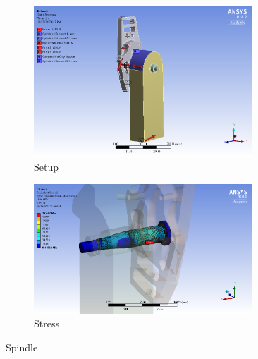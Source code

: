 \documentclass[10pt]{article}
\begin{document}
\begin{figure}[H]
\centering
\begin{subfigure}[b]{.48\textwidth}
\centering
\includegraphics[width=0.9\textwidth]{figures/fea/parts/MS00020-Spindle-Setup}
\caption{Setup}
\end{subfigure}
\begin{subfigure}[b]{.48\textwidth}
\centering
\includegraphics[width=0.9\textwidth]{figures/fea/parts/MS00020-Spindle-Stress}
\caption{Stress}
\end{subfigure}
\caption{Spindle}
\label{fig:MS00020-Spindle}
\end{figure}
\end{document}
